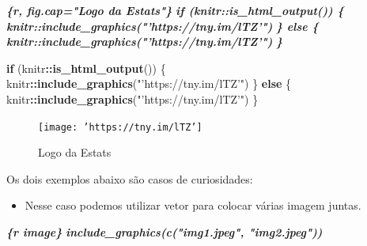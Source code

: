 \documentclass[
]{book}
\newenvironment{Shaded}{\begin{snugshade}}{\end{snugshade}}
\newcommand{\ControlFlowTok}[1]{\textcolor[rgb]{0.13,0.29,0.53}{\textbf{#1}}}
\newcommand{\InformationTok}[1]{\textcolor[rgb]{0.56,0.35,0.01}{\textbf{\textit{#1}}}}
\newcommand{\KeywordTok}[1]{\textcolor[rgb]{0.13,0.29,0.53}{\textbf{#1}}}
\newcommand{\NormalTok}[1]{#1}
\newcommand{\OperatorTok}[1]{\textcolor[rgb]{0.81,0.36,0.00}{\textbf{#1}}}
\newcommand{\StringTok}[1]{\textcolor[rgb]{0.31,0.60,0.02}{#1}}
\providecommand{\tightlist}{%
  \setlength{\itemsep}{0pt}\setlength{\parskip}{0pt}}
\begin{document}
\begin{Shaded}
\begin{Highlighting}[]
\InformationTok{\textasciigrave{}\textasciigrave{}\textasciigrave{}\{r, fig.cap="Logo da Estats"\}}
\InformationTok{if (knitr::is\_html\_output()) \{}
\InformationTok{    knitr::include\_graphics("'https://tny.im/lTZ'")}
\InformationTok{\} else \{}
\InformationTok{    knitr::include\_graphics("'https://tny.im/lTZ'")}
\InformationTok{\}}
\InformationTok{\textasciigrave{}\textasciigrave{}\textasciigrave{}}
\end{Highlighting}
\end{Shaded}

\begin{Shaded}
\begin{Highlighting}[]
\ControlFlowTok{if}\NormalTok{ (knitr}\OperatorTok{::}\KeywordTok{is\_html\_output}\NormalTok{()) \{}
\NormalTok{    knitr}\OperatorTok{::}\KeywordTok{include\_graphics}\NormalTok{(}\StringTok{"'https://tny.im/lTZ'"}\NormalTok{)}
\NormalTok{\} }\ControlFlowTok{else}\NormalTok{ \{}
\NormalTok{    knitr}\OperatorTok{::}\KeywordTok{include\_graphics}\NormalTok{(}\StringTok{"'https://tny.im/lTZ'"}\NormalTok{)}
\NormalTok{\}}
\end{Highlighting}
\end{Shaded}

\begin{figure}

{\centering \texttt{[image: 'https://tny.im/lTZ']} 

}

\caption{Logo da Estats}\label{fig:unnamed-chunk-3}
\end{figure}

Os dois exemplos abaixo são casos de curiosidades:

\begin{itemize}
\tightlist
\item
  Nesse caso podemos utilizar vetor para colocar várias imagem juntas.
\end{itemize}

\begin{Shaded}
\begin{Highlighting}[]
\InformationTok{\textasciigrave{}\textasciigrave{}\textasciigrave{}\{r image\}}
\InformationTok{include\_graphics(c("img1.jpeg", "img2.jpeg"))}
\InformationTok{\textasciigrave{}\textasciigrave{}\textasciigrave{}}
\end{Highlighting}
\end{Shaded}
\end{document}
